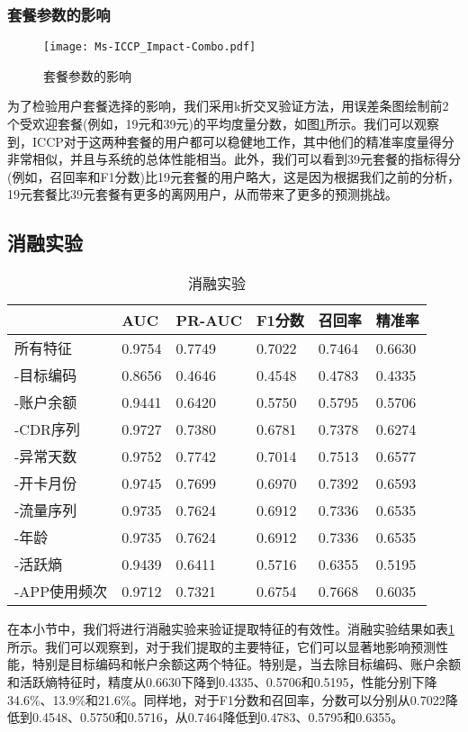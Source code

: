 \subsubsection{套餐参数的影响}
\begin{figure}[hbt]
	\centering
	\texttt{[image: Ms-ICCP\_Impact-Combo.pdf]}
	\caption{套餐参数的影响}
	\label{Fig:Impact-Combo}
\end{figure}
为了检验用户套餐选择的影响，我们采用k折交叉验证方法，用误差条图绘制前2个受欢迎套餐(例如，19元和39元)的平均度量分数，如图\ref{Fig:Impact-Combo}所示。我们可以观察到，ICCP对于这两种套餐的用户都可以稳健地工作，其中他们的精准率度量得分非常相似，并且与系统的总体性能相当。此外，我们可以看到39元套餐的指标得分(例如，召回率和F1分数)比19元套餐的用户略大，这是因为根据我们之前的分析，19元套餐比39元套餐有更多的离网用户，从而带来了更多的预测挑战。


\subsection{消融实验}
\begin{table}[htb]
	\centering
	\caption{消融实验}
	\label{Table:Ablation}
	\begin{tabular}{llllll}
		\toprule
		& AUC  & PR-AUC  & F1分数  & 召回率  & 精准率 \\
		\midrule 
		\midrule
		所有特征 	& 0.9754 & 0.7749 & 0.7022 & 0.7464 & 0.6630	\\
		-目标编码 	& 0.8656 & 0.4646 & 0.4548	& 0.4783 & 0.4335 	\\
		-账户余额 	& 0.9441 & 0.6420 & 0.5750	& 0.5795 & 0.5706	\\
		-CDR序列 	& 0.9727 & 0.7380 & 0.6781 & 0.7378 & 0.6274	\\
		-异常天数 	& 0.9752 & 0.7742 & 0.7014 & 0.7513 & 0.6577	\\
		-开卡月份 	 & 0.9745 & 0.7699 & 0.6970 & 0.7392 & 0.6593	\\
		-流量序列 	& 0.9735 & 0.7624 & 0.6912		& 0.7336 & 0.6535	\\
		-年龄 	& 0.9735 & 0.7624 & 0.6912	& 0.7336 & 0.6535	\\
		-活跃熵 	& 0.9439 & 0.6411 & 0.5716 & 0.6355 & 0.5195	\\
		-APP使用频次 & 0.9712 & 0.7321 & 0.6754	& 0.7668 & 0.6035	\\
		\midrule 
		\bottomrule	
	\end{tabular}
\end{table}

在本小节中，我们将进行消融实验来验证提取特征的有效性。消融实验结果如表\ref{Table:Ablation}所示。我们可以观察到，对于我们提取的主要特征，它们可以显著地影响预测性能，特别是目标编码和帐户余额这两个特征。特别是，当去除目标编码、账户余额和活跃熵特征时，精度从0.6630下降到0.4335、0.5706和0.5195，性能分别下降34.6\%、13.9\%和21.6\%。同样地，对于F1分数和召回率，分数可以分别从0.7022降低到0.4548、0.5750和0.5716，从0.7464降低到0.4783、0.5795和0.6355。

